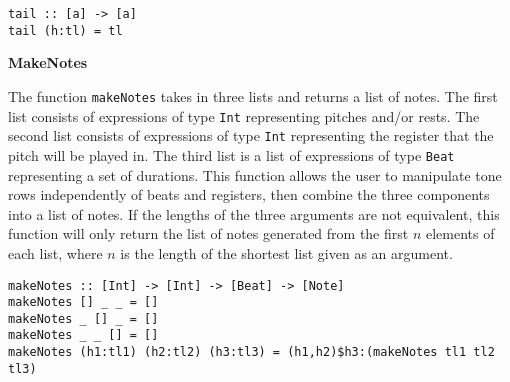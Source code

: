 \begin{verbatim}
tail :: [a] -> [a]
tail (h:tl) = tl
\end{verbatim} 


\noindent\textbf{MakeNotes}

The function \texttt{makeNotes} takes in three lists and returns a list 
of notes. The first list consists of expressions of type \texttt{Int} representing 
pitches and/or rests. The second list consists of expressions of type \texttt{Int}
representing the register that the pitch will be played in. The third list is a list 
of expressions of type \texttt{Beat} representing a set of durations.  This function allows the user 
to manipulate tone rows independently of beats and registers, then combine the three components
into a list of notes. If the lengths of the three arguments are not equivalent, this function
will only return the list of notes generated from the first $n$ elements of each list, where $n$ is the
length of the shortest list given as an argument.

\begin{verbatim}
makeNotes :: [Int] -> [Int] -> [Beat] -> [Note]
makeNotes [] _ _ = []
makeNotes _ [] _ = []
makeNotes _ _ [] = []
makeNotes (h1:tl1) (h2:tl2) (h3:tl3) = (h1,h2)$h3:(makeNotes tl1 tl2 tl3)
\end{verbatim}
